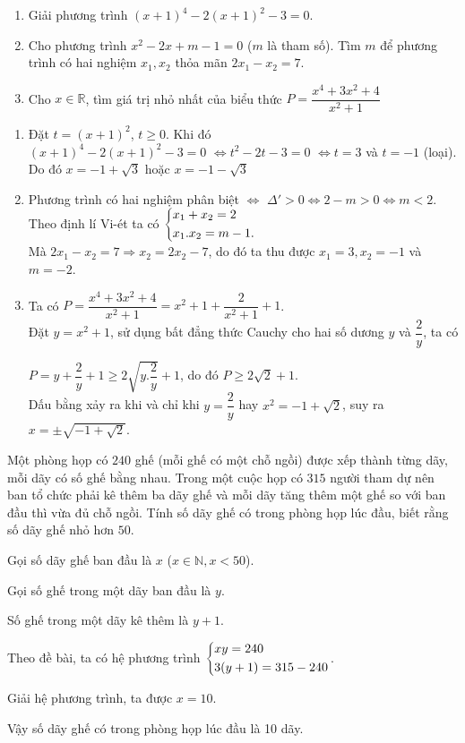 \begin{ex}%
\hfill
    \begin{enumerate}    
        \item Giải phương trình  $(x+1)^4-2(x+1)^2-3=0$.
        \item Cho phương trình $x^2-2x+m-1=0$ ($m$ là tham số). Tìm $m$ để phương trình có hai nghiệm $x_1,x_2$ thỏa mãn $2x_1-x_2=7$.
        \item Cho $x \in \mathbb{R}$, tìm giá trị nhỏ nhất của biểu thức $P=\dfrac{x^4+3x^2+4}{x^2+1}$
    \end{enumerate}
\loigiai
    {
    \begin{enumerate}
        \item  Đặt $t=(x+1)^2$, $t \ge 0$. Khi đó\\
       $ (x+1)^4-2(x+1)^2-3=0$ $\Leftrightarrow t^2-2t-3=0$ $\Leftrightarrow t=3$ và $t=-1$ (loại). Do đó $x=-1+\sqrt{3}$ hoặc $x=-1-\sqrt{3}$
        \item Phương trình có hai nghiệm  phân biệt $\Leftrightarrow$ $\Delta'>0 \Leftrightarrow 2-m>0 \Leftrightarrow m<2$.\\
        Theo định lí Vi-ét ta có $\left\{\begin{aligned}&x_1+x_2=2 \\ &x_1.x_2=m-1.\end{aligned}\right.$\\
        Mà $2x_1-x_2=7 \Rightarrow x_2=2x_2 -7 $, do đó ta thu được $x_1=3, x_2=-1$ và $m=-2$.
        \item Ta có $P=\dfrac{x^4+3x^2+4}{x^2+1}=x^2+1+\dfrac{2}{x^2+1}+1$.\\
        Đặt $y=x^2+1$, sử dụng bất đẳng thức Cauchy cho hai số dương $y$ và $\dfrac{2}{y}$, ta có 
        
        $P=y+\dfrac{2}{y}+1 \ge 2\sqrt{y.\dfrac{2}{y}}+1$, do đó $P \ge 2\sqrt{2}+1$.\\
        Dấu bằng xảy ra khi và chỉ khi $y=\dfrac{2}{y}$ hay $x^2=-1+\sqrt{2}$, suy ra $x=\pm \sqrt{-1+\sqrt{2}}$.
    \end{enumerate}
    }
\end{ex}

\begin{ex}%
   Một phòng họp có $240$ ghế (mỗi ghế có một chỗ ngồi) được xếp thành từng dãy, mỗi dãy có số ghế bằng nhau. Trong một cuộc họp có $315$ người tham dự nên ban tổ chức phải kê thêm ba dãy ghế và mỗi dãy tăng thêm một ghế so với ban đầu thì vừa đủ chỗ ngồi. Tính số dãy ghế có trong phòng họp lúc đầu, biết rằng số dãy ghế nhỏ hơn $50$.
\loigiai
    {
   Gọi số dãy ghế ban đầu là $x$ ($x \in \mathbb{N}, x<50$).
   
   Gọi số ghế trong một dãy ban đầu là $y$.
   
   Số ghế trong một dãy kê thêm là $y+1$.
   
   Theo đề bài, ta có hệ phương trình $\left\{\begin{aligned}&xy=240\\&3(y+1)=315-240\end{aligned}\right.$.
   
   Giải hệ phương trình, ta được $x=10$.
   
   Vậy số dãy ghế có trong phòng họp lúc đầu là 10 dãy.
    }
\end{ex}

